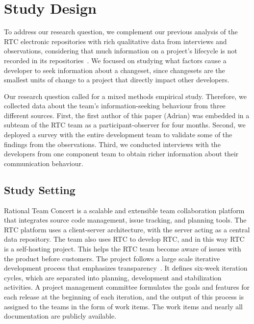 \documentclass[12pt,oneside]{book}
\begin{document}
\section{Study Design}
\label{sec:studydesign}

To address our research question, we complement our previous analysis of the RTC electronic repositories with rich qualitative data from interviews and observations, considering that much information on a project's lifecycle is not recorded in its repositories~\cite{aranda:icse:2009}. We focused on studying what factors cause a developer to seek information about a changeset, since changesets are the smallest units of change to a project that directly impact other developers.

Our research question called for a mixed methods empirical study. Therefore, we collected data about the team's information-seeking behaviour from three different sources.
First, the first author of this paper (Adrian) was embedded in a subteam of the RTC team as a participant-observer for four months.
Second, we deployed a survey with the entire development team to validate some of the findings from the observations.
Third, we conducted interviews with the developers from one component team to obtain richer information about their communication behaviour.

\subsection{Study Setting}
\label{sec:rtc}
 
Rational Team Concert is a scalable and extensible team collaboration platform that integrates source code management, issue tracking, and planning tools. The RTC platform uses a client-server architecture, with the server acting as a central data repository.
The team also uses RTC to develop RTC, and in this way RTC is a self-hosting project.
This helps the RTC team become aware of issues with the product before customers.%
The project follows a large scale iterative development process that emphasizes transparency~\cite{frost:ieeesoftware:2007}.
It defines six-week iteration cycles, which are  separated into planning, development and stabilization activities. A project management committee formulates the goals and features for each release at the beginning of each iteration, and the output of this process is assigned to the teams in the form of work items. The work items and nearly all documentation are publicly available.  %
\end{document}
